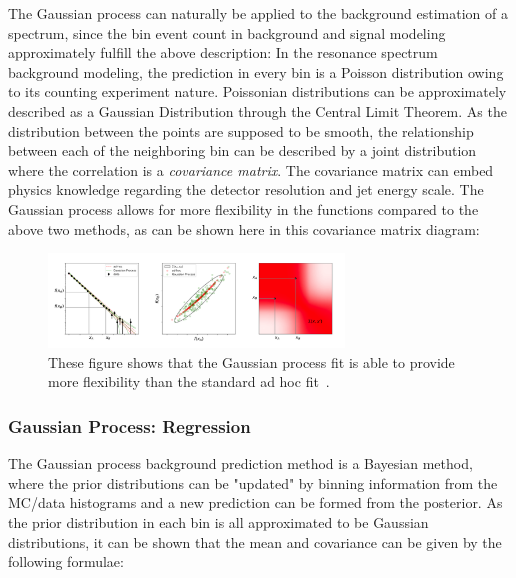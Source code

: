     The Gaussian process can naturally be applied to the background estimation of a spectrum, since the bin event count in background and signal modeling approximately fulfill the above description: In the resonance spectrum background modeling, the prediction in every bin is a Poisson distribution owing to its counting experiment nature. Poissonian distributions can be approximately described as a Gaussian Distribution through the Central Limit Theorem. As the distribution between the points are supposed to be smooth, the relationship between each of the neighboring bin can be described by a joint distribution where the correlation is a \textit{covariance matrix}. The covariance matrix can embed physics knowledge regarding the detector resolution and jet energy scale. The Gaussian process allows for more flexibility in the functions compared to the above two methods, as can be shown here in this covariance matrix diagram:

    \begin{figure}[!htb]
        \begin{center}
            \includegraphics[width=0.7\textwidth]{figures/chapter_analysismethod/GP}
            \caption{
                These figure shows that the Gaussian process fit is able to provide more flexibility than the standard ad hoc fit~\cite{frate2017modeling}.
            }
            \label{signalinjection}
        \end{center}
    \end{figure}
    \FloatBarrier


\subsubsection{Gaussian Process: Regression}

    The Gaussian process background prediction method is a Bayesian method, where the prior distributions can be "updated" by binning information from the MC/data histograms and a new prediction can be formed from the posterior. As the prior distribution in each bin is all approximated to be Gaussian distributions, it can be shown that the mean and covariance can be given by the following formulae:

